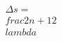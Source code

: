 \documentclass[preview]{standalone}
\begin{document}
\begin{align*}
\Delta s = \\frac{2n+1}{2}\\lambda
\end{align*}
\end{document}
